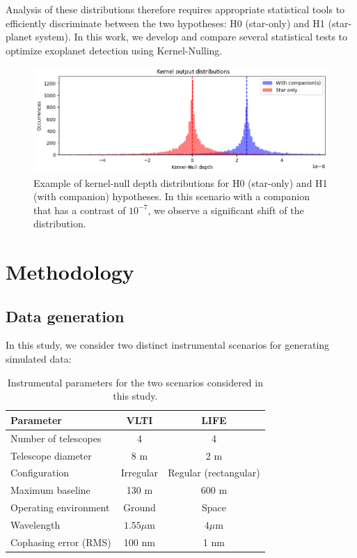 \documentclass{article}
\begin{document}
Analysis of these distributions therefore requires appropriate statistical tools to efficiently discriminate between the two hypotheses: H0 (star-only) and H1 (star-planet system). In this work, we develop and compare several statistical tests to optimize exoplanet detection using Kernel-Nulling.

\begin{figure}[H]
\centering
\includegraphics[width=\linewidth]{img/output_distribution.png}
\caption{Example of kernel-null depth distributions for H0 (star-only) and H1 (with companion) hypotheses. In this scenario with a companion that has a contrast of $10^{-7}$, we observe a significant shift of the distribution.}
\label{fig:distribution}
\end{figure}


\section{Methodology}

\subsection{Data generation}

In this study, we consider two distinct instrumental scenarios for generating simulated data:

\begin{table}[H]
\centering
\begin{tabular}{|l|c|c|}
\hline
\textbf{Parameter} & \textbf{VLTI} & \textbf{LIFE} \\
\hline
Number of telescopes & 4 & 4 \\
Telescope diameter & 8 m & 2 m \\
Configuration & Irregular & Regular (rectangular) \\
Maximum baseline & 130 m & 600 m \\
Operating environment & Ground & Space \\
Wavelength & $1.55\mu$m & $4\mu$m \\
Cophasing error (RMS) & 100 nm & 1 nm \\
\hline
\end{tabular}
\caption{Instrumental parameters for the two scenarios considered in this study.}
\label{tab:scenarios}
\end{table}
\end{document}
